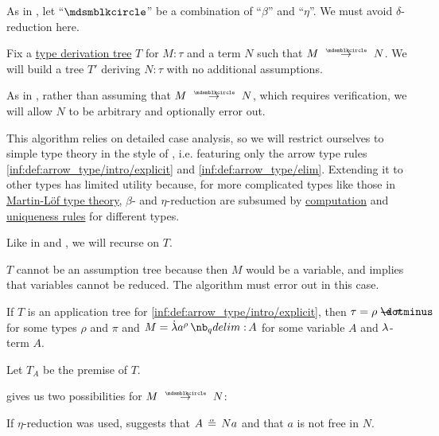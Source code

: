 \begin{algorithm}\label{alg:simply_typed_reduction}
  As in , let \enquote{\( {\Anon} \)} be a combination of \enquote{\( \beta \)} and \enquote{\( \eta \)}. We must avoid \( \delta \)-reduction here.

  Fix a \hyperref[def:type_derivation_tree]{type derivation tree} \( T \) for \( M: \tau \) and a term \( N \) such that \( M \pred N \). We will build a tree \( T' \) deriving \( N: \tau \) with no additional assumptions.

  As in , rather than assuming that \( M \pred N \), which requires verification, we will allow \( N \) to be arbitrary and optionally error out.

  This algorithm relies on detailed case analysis, so we will restrict ourselves to simple type theory in the style of , i.e. featuring only the arrow type rules \ref{inf:def:arrow_type/intro/explicit} and \ref{inf:def:arrow_type/elim}. Extending it to other types has limited utility because, for more complicated types like those in \hyperref[def:mltt]{Martin-L\"of type theory}, \( \beta \)- and \( \eta \)-reduction are subsumed by \hyperref[rem:type_theory_rule_classification/equality/comp]{computation} and \hyperref[rem:type_theory_rule_classification/equality/uniq]{uniqueness rules} for different types.

  Like in  and , we will recurse on \( T \).

  \begin{thmenum}
     \( T \) cannot be an assumption tree because then \( M \) would be a variable, and  implies that variables cannot be reduced. The algorithm must error out in this case.

     If \( T \) is an application tree for \ref{inf:def:arrow_type/intro/explicit}, then \( \tau = \rho \synimplies \pi \) for some types \( \rho \) and \( \pi \) and \( M = \qabs {a^\rho} A \) for some variable \( A \) and \( {\mathrm \lambda} \)-term \( A \).

    Let \( T_A \) be the premise of \( T \).

     gives us two possibilities for \( M \pred N \):
    \begin{thmenum}
       If \( \eta \)-reduction was used,  suggests that \( A \aequiv Na \) and that \( a \) is not free in \( N \).


\end{thmenum}
\end{thmenum}
\end{algorithm}
